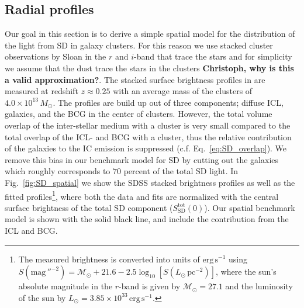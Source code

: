 \documentclass[10pt,aps,pra,reprint,amsmath,amsfonts,amssymb,showpacs,nofootinbib,floatfix]{revtex4-1}
\newcommand{\rmn}{\mathrm}
\newcommand{\sd}{\rmn{SD}}
\newcommand{\msun}{M_\odot}
\begin{document}
\subsection{Radial profiles}
\label{sect:SD_radial}
Our goal in this section is to derive a simple spatial model for the
distribution of the light from SD in galaxy clusters. For this reason
we use stacked cluster observations by Sloan in the $r$ and $i$-band
that trace the stars and for simplicity we assume that the dust trace
the stars in the clusters {\bf Christoph, why is this a valid
  approximation?}. The stacked surface brightness profiles in
\cite{2005MNRAS.358..949Z} are measured at redshift $z \approx 0.25$
with an average mass of the clusters of $4.0\times10^{13}\,\msun$. The
profiles are build up out of three components; diffuse ICL, galaxies,
and the BCG in the center of clusters. However, the total volume
overlap of the inter-stellar medium with a cluster is very small
compared to the total overlap of the ICL- and BCG with a cluster, thus
the relative contribution of the galaxies to the IC emission is
suppressed (c.f. Eq.~\ref{eq:SD_overlap}). We remove this bias in our
benchmark model for SD by cutting out the galaxies which roughly
corresponds to $70$ percent of the total SD light. In
Fig.~\ref{fig:SD_spatial} we show the SDSS stacked brightness profiles
as well as the fitted profiles\footnote{The measured brightness is
  converted into units of $\rmn{erg}\,\rmn{s}^{-1}$ using
  \cite{2010...book} $S(\rmn{mag}\,''^{-2}) =
  \mathcal{M}_\odot+21.6-2.5\log_{10}[S(L_\odot\,\rmn{pc}^{-2})]$,
  where the sun's absolute magnitude in the $r$-band is given by
  $\mathcal{M}_\odot=27.1$ \cite{1998gaas.book.....B} and the
  luminosity of the sun by $L_\odot=3.85\times10^{33}\,
  \rmn{erg}\,\rmn{s}^{-1}$.}, where both the data and fits are
normalized with the central surface brightness of the total SD
component ($S_\sd^\rmn{tot}(0)$). Our spatial benchmark model is shown
with the solid black line, and include the contribution from the ICL
and BCG.
\end{document}
